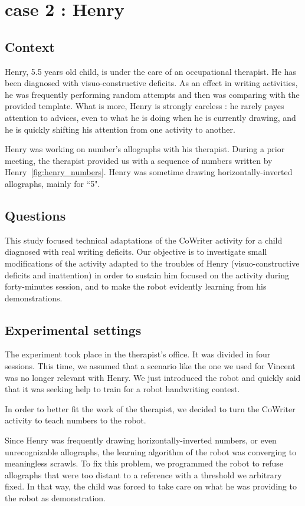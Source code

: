 \documentclass{sig-alternate}
\begin{document}
\section{case 2 : Henry}

\subsection{Context}

Henry, 5.5 years old child, is under the care of an occupational
therapist. He has been diagnosed with visuo-constructive deficits.
As an effect in writing activities, he was frequently performing random attempts and then was comparing
with the provided template. What is more, Henry is strongly careless : he
rarely payes attention to
advices, even to what he is doing when he is currently drawing, and he is
quickly shifting his attention from one activity to another.

Henry was working on number's allographs with his therapist. During a prior
meeting, the therapist provided us with a sequence of numbers
written by Henry~\ref{fig:henry_numbers}. Henry was sometime drawing
horizontally-inverted allographs, mainly for ``5".

\subsection{Questions}
This study focused technical adaptations of the CoWriter activity for a 
child diagnosed with real writing deficits.
Our objective is to investigate small modifications of the activity adapted to
the troubles of Henry (visuo-constructive deficits and inattention) in order to
sustain him focused
on the activity during forty-minutes session, and to make the robot
evidently learning from his demonstrations.

\subsection{Experimental settings}
The experiment took place in the therapist's office. It was divided in four
sessions. This time, we assumed that a scenario like the one we used for Vincent was
no longer relevant with Henry. We just introduced the robot and quickly
said that it was seeking help to train for a robot handwriting contest.

In order to better fit the work of the therapist, we decided to turn the 
CoWriter activity to teach numbers to the robot.

Since Henry was frequently drawing horizontally-inverted numbers, or even
unrecognizable allographs, the learning algorithm of the robot was converging to
meaningless scrawls. To fix this problem, we programmed the robot to refuse allographs that
were too distant to a reference with a threshold we arbitrary fixed. In that way,
the child was forced to take care on what he was providing to the robot as
demonstration. 
\end{document}
